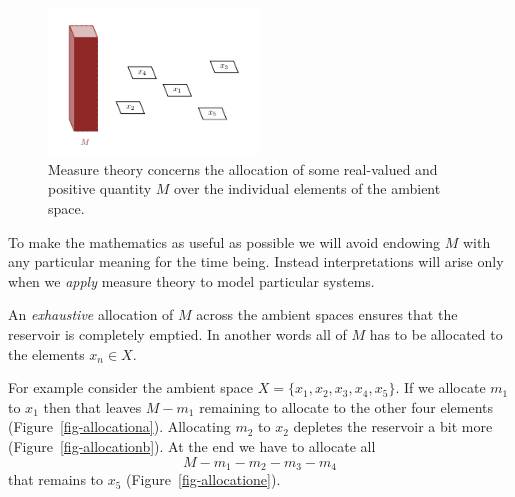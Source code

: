 \documentclass[
  letterpaper,
  DIV=11,
  numbers=noendperiod]{scrartcl}
\begin{document}
\begin{figure}

{\centering \includegraphics[width=0.5\textwidth,height=\textheight]{figures/allocations/0/0.pdf}

}

\caption{\label{fig-reservoir}Measure theory concerns the allocation of
some real-valued and positive quantity \(M\) over the individual
elements of the ambient space.}

\end{figure}

To make the mathematics as useful as possible we will avoid endowing
\(M\) with any particular meaning for the time being. Instead
interpretations will arise only when we \emph{apply} measure theory to
model particular systems.

An \emph{exhaustive} allocation of \(M\) across the ambient spaces
ensures that the reservoir is completely emptied. In another words all
of \(M\) has to be allocated to the elements \(x_{n} \in X\).

For example consider the ambient space
\(X = \{x_1, x_2, x_3, x_4, x_5 \}\). If we allocate \(m_{1}\) to
\(x_{1}\) then that leaves \(M - m_{1}\) remaining to allocate to the
other four elements (Figure~\ref{fig-allocationa}). Allocating \(m_{2}\)
to \(x_{2}\) depletes the reservoir a bit more
(Figure~\ref{fig-allocationb}). At the end we have to allocate all \[
M - m_{1} - m_{2} - m_{3} - m_{4}
\] that remains to \(x_{5}\) (Figure~\ref{fig-allocatione}).
\end{document}
